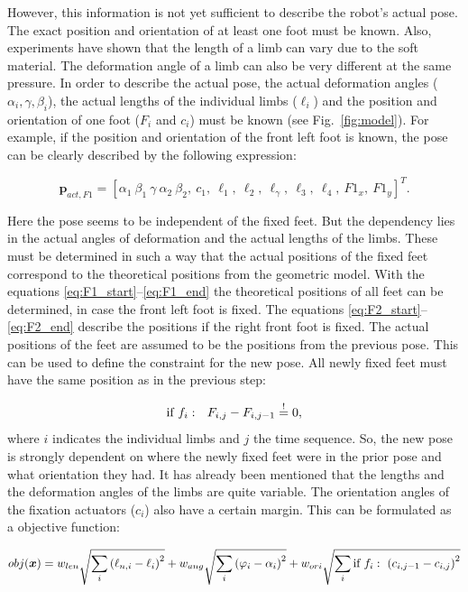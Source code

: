 \documentclass[10pt,a4paper]{article}
\begin{document}
However, this information is not yet sufficient to describe the robot's actual pose.
The exact position and orientation of at least one foot must be known.
Also, experiments have shown that the length of a limb can vary due to the soft material. The deformation angle of a limb can also be very different at the same pressure.
In order to describe the actual pose, the actual deformation angles ($\alpha_i, \gamma, \beta_i$), the actual lengths of the individual limbs ($\ell_i$) and the position and orientation of one foot ($F_i$ and $c_i$) must be known (see Fig.~\ref{fig:model}).
For example, if the position and orientation of the front left foot is known, the pose can be clearly described by the following expression:

\begin{equation}
\bm{p}_{act, F1} = \left[ \alpha_1~\beta_1~\gamma~\alpha_2~\beta_2,~c_1,~\ell_1,~\ell_2,~\ell_\gamma,~\ell_3,~\ell_4,~F1_x,~F1_y\right]^T.
\end{equation}

Here the pose seems to be independent of the fixed feet. But the dependency lies in the actual angles of deformation and the actual lengths of the limbs. These must be determined in such a way that the actual positions of the fixed feet correspond to the theoretical positions from the geometric model.
With the equations \eqref{eq:F1_start}--\eqref{eq:F1_end} the theoretical positions of all feet can be determined, in case the front left foot is fixed. The equations \eqref{eq:F2_start}--\eqref{eq:F2_end} describe the positions if the right front foot is fixed.
The actual positions of the feet are assumed to be the positions from the previous pose.
This can be used to define the constraint for the new pose.
All newly fixed feet must have the same position as in the previous step:

\newcommand{\mbeq}{\overset{!}{=}}
\begin{equation}
\textnormal{if}~f_i:~~F_{i,j} - F_{i,j-1} \mbeq 0,
\label{eq:constraint}
\end{equation}
where $i$ indicates the individual limbs and $j$ the time sequence.
So, the new pose is strongly dependent on where the newly fixed feet were in the prior pose and what orientation they had.
It has already been mentioned that the lengths and the deformation angles of the limbs are quite variable. 
The orientation angles of the fixation actuators ($c_i$) also have a certain margin.
This can be formulated as a objective function:

\begin{equation}
obj(\bm{x}) = w_{len}\sqrt{\sum_i \left( \ell_{n,i} - \ell_i \right)^2} 
+ w_{ang} \sqrt{\sum_i \left( \varphi_i - \alpha_i \right)^2}
+ w_{ori} \sqrt{\sum_i \textnormal{if}~f_i:~\left( c_{i,j-1} - c_{i, j} \right)^2}
\label{eq:objective_function}
\end{equation}
\end{document}

